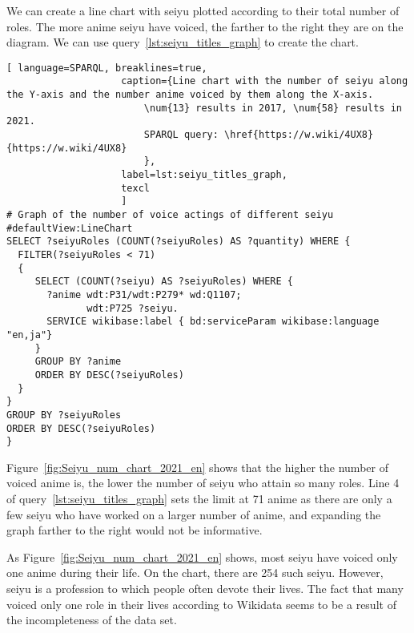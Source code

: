 We can create a line chart with seiyu plotted according to their total number of roles. The more anime seiyu have voiced, the farther to the right they are on the diagram. We can use query~\ref{lst:seiyu_titles_graph} to create the chart.

\begin{lstlisting}[ language=SPARQL, breaklines=true,
                    caption={Line chart with the number of seiyu along the Y-axis and the number anime voiced by them along the X-axis.
                        \num{13} results in 2017, \num{58} results in 2021.
                        SPARQL query: \href{https://w.wiki/4UX8}{https://w.wiki/4UX8}
                        },
                    label=lst:seiyu_titles_graph,
                    texcl 
                    ]
# Graph of the number of voice actings of different seiyu
#defaultView:LineChart
SELECT ?seiyuRoles (COUNT(?seiyuRoles) AS ?quantity) WHERE {
  FILTER(?seiyuRoles < 71)
  {
     SELECT (COUNT(?seiyu) AS ?seiyuRoles) WHERE {
       ?anime wdt:P31/wdt:P279* wd:Q1107;
              wdt:P725 ?seiyu.
       SERVICE wikibase:label { bd:serviceParam wikibase:language "en,ja"}
     }
     GROUP BY ?anime
     ORDER BY DESC(?seiyuRoles)
  }
}
GROUP BY ?seiyuRoles
ORDER BY DESC(?seiyuRoles)
}
\end{lstlisting}%

Figure~\ref{fig:Seiyu_num_chart_2021_en} shows that the higher the number of voiced anime is, the lower the number of seiyu who attain so many roles. Line \num{4} of query~\ref{lst:seiyu_titles_graph} sets the limit at \num{71} anime as there are only a few seiyu who have worked on a larger number of anime, and expanding the graph farther to the right would not be informative.

As Figure~\ref{fig:Seiyu_num_chart_2021_en} shows, most seiyu have voiced only one anime during their life. On the chart, there are \num{254} such seiyu. However, seiyu is a profession to which people often devote their lives. The fact that many voiced only one role in their lives according to Wikidata seems to be a result of the incompleteness of the data set.

\begin{figure*}[h]

    \setlength{\fboxsep}{0pt}%
    \setlength{\fboxrule}{1pt}%
	\caption[Chart of the number of roles voiced by different seiyu, 2021.]{Chart of number of roles voiced by different seiyu, 2021. The chart is constructed using the output of query~\ref{lst:seiyu_titles_graph}.}%
    \label{fig:Seiyu_num_chart_2021_en}%
\end{figure*} 


